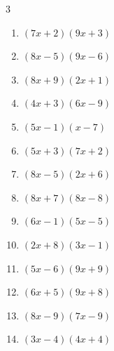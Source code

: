\begin{multicols}{3}
\begin{enumerate}

  \item $(7x+2)(9x+3)$


  \item $(8x-5)(9x-6)$


  \item $(8x+9)(2x+1)$


  \item $(4x+3)(6x-9)$


  \item $(5x-1)(x-7)$


\columnbreak %

\resetques

  \item $(5x+3)(7x+2)$


  \item $(8x-5)(2x+6)$


  \item $(8x+7)(8x-8)$


  \item $(6x-1)(5x-5)$


  \item $(2x+8)(3x-1)$


  \item $(5x-6)(9x+9)$


  \item $(6x+5)(9x+8)$


  \item $(8x-9)(7x-9)$


  \item $(3x-4)(4x+4)$


\end{enumerate}
\end{multicols}

